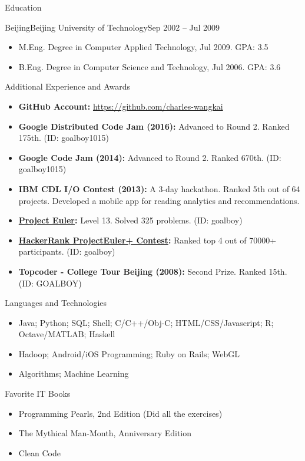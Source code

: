 \documentclass[]{mcdowellcv}
\begin{document}
	\begin{cvsection}{Education}
		\begin{cvsubsection}{Beijing}{Beijing University of Technology}{Sep 2002 – Jul 2009}
			\begin{itemize}
				\item M.Eng. Degree in Computer Applied Technology, Jul 2009. GPA: 3.5
				\item B.Eng. Degree in Computer Science and Technology, Jul 2006. GPA: 3.6
			\end{itemize}
		\end{cvsubsection}
	\end{cvsection}
	
	\begin{cvsection}{Additional Experience and Awards}
		\begin{cvsubsection}{}{}{}
			\begin{itemize}
				\item \textbf{GitHub Account:} \url{https://github.com/charles-wangkai}
				\item \textbf{Google Distributed Code Jam (2016):} Advanced to Round 2. Ranked 175th. (ID: goalboy1015)
				\item \textbf{Google Code Jam (2014):} Advanced to Round 2. Ranked 670th. (ID: goalboy1015)
				\item \textbf{IBM CDL I/O Contest (2013):} A 3-day hackathon. Ranked 5th out of 64 projects. Developed a mobile app for reading analytics and recommendations.
				\item \textbf{\href{https://projecteuler.net}{Project Euler}:} Level 13. Solved 325 problems. (ID: goalboy)
				\item \textbf{\href{https://www.hackerrank.com/projecteuler}{HackerRank ProjectEuler+ Contest}:} Ranked top 4 out of 70000+ participants. (ID: goalboy)
				\item \textbf{Topcoder - College Tour Beijing (2008):} Second Prize. Ranked 15th. (ID: GOALBOY)
			\end{itemize}
		\end{cvsubsection}
	\end{cvsection}
	
	\begin{cvsection}{Languages and Technologies}
		\begin{cvsubsection}{}{}{}
			\begin{itemize}
				\item Java; Python; SQL; Shell; C/C++/Obj-C; HTML/CSS/Javascript; R; Octave/MATLAB; Haskell
				\item Hadoop; Android/iOS Programming; Ruby on Rails; WebGL
				\item Algorithms; Machine Learning
			\end{itemize}
		\end{cvsubsection}
	\end{cvsection}
	
	\begin{cvsection}{Favorite IT Books}
		\begin{cvsubsection}{}{}{}
			\begin{itemize}
				\item Programming Pearls, 2nd Edition (Did all the exercises)
				\item The Mythical Man-Month, Anniversary Edition
				\item Clean Code
			\end{itemize}
		\end{cvsubsection}
	\end{cvsection}
	
\end{document}
